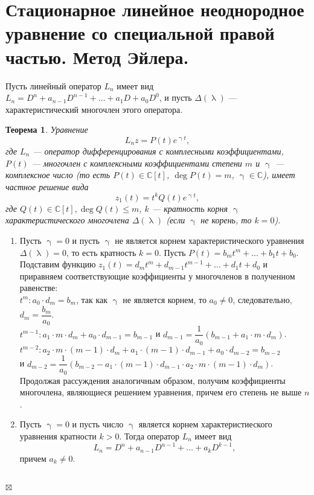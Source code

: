 \documentclass[a4paper, 12pt]{report}
\newenvironment{Proof} %
{\par\noindent{$\blacklozenge$}} %
{\hfill$\scriptstyle\boxtimes$}
\newcommand{\Cm}{\mathbb{C}}
\renewcommand{\lambda}{\uplambda}
\newcommand{\Ln}{L_n = D^n + a_{n-1}D^{n-1} + \ldots + a_1D + a_0D^0}
\begin{document}
\section{Стационарное линейное неоднородное уравнение со специальной правой частью. Метод Эйлера.}
Пусть линейный оператор $L_n$ имеет вид $\Ln$, и пусть $\Delta(\lambda)$ --- характеристический многочлен этого оператора.
\newtheorem*{2_5_1}{Теорема}\begin{2_5_1}
	Уравнение $$L_nz = P(t)e^{\upgamma t},$$ где $L_n$ --- оператор дифференцирования с комплесными коэффициентами, $P(t)$ --- многочлен с комплексными коэффициентами степени $m$ и $\upgamma$ --- комплексное число (то есть $P(t)\in\Cm[t]$, $\deg P(t) = m$, $\upgamma \in \Cm$), имеет частное решение вида $$z_1(t) = t^kQ(t)e^{\upgamma t},$$ где $Q(t) \in \Cm[t], \deg Q(t) \leqslant m$, $k$ --- кратность корня $\upgamma$ характеристического многочлена $\Delta(\lambda)$ (если $\upgamma$ не корень, то $k=0$).
\end{2_5_1}\begin{Proof}
\begin{enumerate}
	\item Пусть $\upgamma = 0$ и пусть $\upgamma$ не является корнем характеристического уравнения $\Delta(\lambda) = 0$, то есть кратность $k = 0$. Пусть $P(t) = b_mt^m + \ldots + b_1t + b_0$. Подставим функцию $z_1(t) = d_mt^m + d_{m-1}t^{m-1} + \ldots + d_1t + d_0$ и приравняем соответствующие коэффициенты у многочленов в полученном равенстве:\\
	$t^m : a_0\cdot d_m = b_m$, так как $\upgamma$ не является корнем, то $a_0 \ne 0$, следовательно, $d_m = \dfrac{b_m}{a_0}$.\\
	$t^{m-1} : a_1\cdot m\cdot d_m + a_0\cdot  d_{m-1}= b_{m-1}$ и $d_{m-1} = \dfrac{1}{a_0}(b_{m-1} + a_1\cdot m \cdot d_m)$.\\
	$t^{m-2} : a_2\cdot m\cdot (m-1)\cdot d_m + a_1\cdot (m-1) \cdot d_{m-1} + a_0 \cdot d_{m-2} = b_{m-2}$\\ и $d_{m-2} = \dfrac{1}{a_0}(b_{m-2} - a_1\cdot (m-1)\cdot d_{m-1}\cdot a_2\cdot m\cdot (m-1)\cdot d_m)$.\\
	Продолжая рассуждения аналогичным образом, получим коэффициенты многочлена, являющиеся решением уравнения, причем его степень не выше $n$.
	\item Пусть $\upgamma = 0$ и пусть число $\upgamma$ является корнем характеристиеского уравнения кратности $k > 0$. Тогда оператор $L_n$ имеет вид $$L_n = D^n + a_{n-1}D^{n-1} + \ldots + a_k D^{k-1},$$ причем $a_k \ne 0$.\\\\

\end{enumerate}
\end{Proof}
\end{document}
